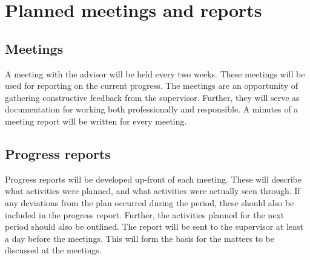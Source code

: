 \chapter{Planned meetings and reports}

\section{Meetings}
A meeting with the advisor will be held every two weeks. These meetings will be used for reporting on the current progress. The meetings are an opportunity of gathering constructive feedback from the supervisor. Further, they will serve as documentation for working both professionally and responsible. A minutes of a meeting report will be written for every meeting.

\section{Progress reports}
Progress reports will be developed up-front of each meeting. These will describe what activities were planned, and what activities were actually seen through. If any deviations from the plan occurred during the period, these should also be included in the progress report. Further, the activities planned for the next period should also be outlined. The report will be sent to the supervisor at least a day before the meetings. This will form the basis for the matters to be discussed at the meetings.